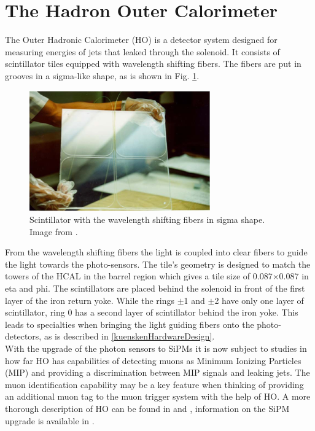 \section{The Hadron Outer Calorimeter}\label{HOIntro}
The Outer Hadronic Calorimeter (HO) is a detector system designed for measuring energies of jets that leaked through the solenoid. It consists of scintillator tiles equipped with wavelength shifting fibers. The fibers are put in grooves in a sigma-like shape, as is shown in Fig. \ref{kuenskenScintWithFiber}.
\begin{figure}[h]
\centering
\begin{minipage}[t]{0.475\textwidth}
\includegraphics[width=\textwidth]{Figures/kuensken/hoTile.png}
\caption{Scintillator with the wavelength shifting fibers in sigma shape. Image from \cite{hoDesign}.}
\label{kuenskenScintWithFiber}
\end{minipage}
\hspace{1cm}
\begin{minipage}[t]{0.435\textwidth}

\end{minipage}
\end{figure}
From the wavelength shifting fibers the light is coupled into clear fibers to guide the light towards the photo-sensors. The tile's geometry is designed to match the towers of the HCAL in the barrel region which gives a tile size of 0.087$\times$0.087 in eta and phi. The scintillators are placed behind the solenoid in front of the first layer of the iron return yoke. While the rings $\pm$1 and $\pm$2 have only one layer of scintillator, ring 0 has a second layer of scintillator behind the iron yoke. This leads to specialties when bringing the light guiding fibers onto the photo-detectors, as is described in \ref{kuenskenHardwareDesign}.\\
With the upgrade of the photon sensors to SiPMs it is now subject to studies in how far HO has capabilities of detecting muons as Minimum Ionizing Particles (MIP) and providing a discrimination between MIP signals and leaking jets. The muon identification capability may be a key feature when thinking of providing an additional muon tag to the muon trigger system with the help of HO. A more thorough description of HO can be found in \cite{hcalTDR} and \cite{hoDesign}, information on the SiPM upgrade is available in \cite{beniCalor}.